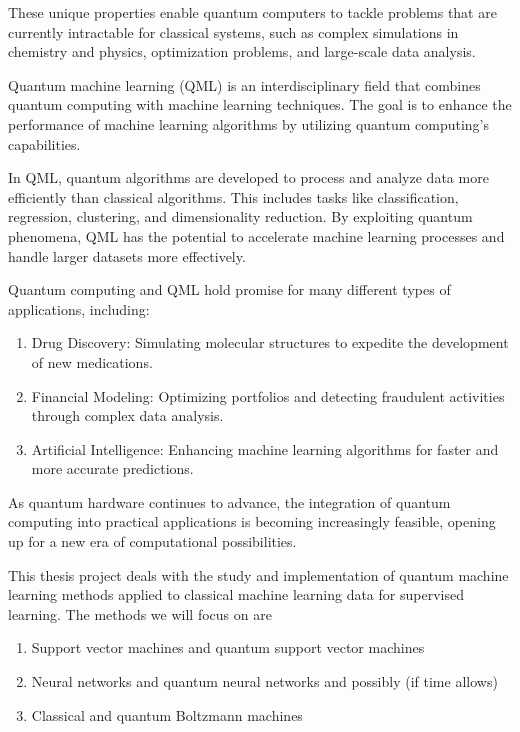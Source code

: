 \documentclass[%
oneside,                 %
final,                   %
10pt]{article}
\begin{document}
These unique properties enable quantum computers to tackle problems
that are currently intractable for classical systems, such as complex
simulations in chemistry and physics, optimization problems, and
large-scale data analysis.

Quantum machine learning (QML) is an interdisciplinary field that
combines quantum computing with machine learning techniques. The goal
is to enhance the performance of machine learning algorithms by
utilizing quantum computing’s capabilities.

In QML, quantum algorithms are developed to process and analyze data
more efficiently than classical algorithms. This includes tasks like
classification, regression, clustering, and dimensionality
reduction. By exploiting quantum phenomena, QML has the potential to
accelerate machine learning processes and handle larger datasets more
effectively.

Quantum computing and QML hold promise for many different types of  applications, including:

\begin{enumerate}
\item Drug Discovery: Simulating molecular structures to expedite the development of new medications.

\item Financial Modeling: Optimizing portfolios and detecting fraudulent activities through complex data analysis.

\item Artificial Intelligence: Enhancing machine learning algorithms for faster and more accurate predictions. 
\end{enumerate}

\noindent
As quantum hardware continues to advance, the integration of quantum
computing into practical applications is becoming increasingly
feasible, opening up for  a new era of computational possibilities.

This thesis project deals with the study and implementation of quantum
machine learning methods applied to classical machine learning data
for supervised learning.
The methods we will focus on are
\begin{enumerate}
\item Support vector machines and quantum support vector machines

\item Neural networks and quantum neural networks and possibly (if time allows)

\item Classical and quantum Boltzmann machines
\end{enumerate}
\end{document}
